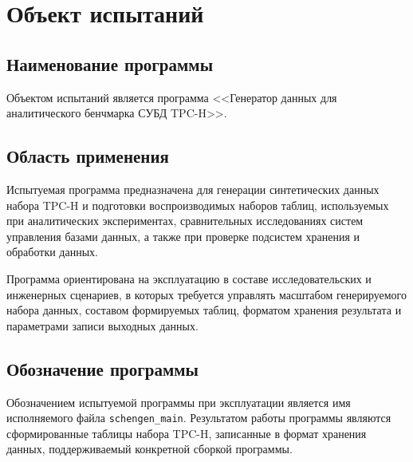 \section{Объект испытаний}

\subsection{Наименование программы}

Объектом испытаний является программа <<Генератор данных для аналитического
бенчмарка СУБД TPC-H>>.

\subsection{Область применения}

Испытуемая программа предназначена для генерации синтетических данных набора
TPC-H и подготовки воспроизводимых наборов таблиц, используемых при
аналитических экспериментах, сравнительных исследованиях систем управления
базами данных, а также при проверке подсистем хранения и обработки данных.

Программа ориентирована на эксплуатацию в составе исследовательских и
инженерных сценариев, в которых требуется управлять масштабом генерируемого
набора данных, составом формируемых таблиц, форматом хранения результата и
параметрами записи выходных данных.

\subsection{Обозначение программы}

Обозначением испытуемой программы при эксплуатации является имя исполняемого
файла \texttt{schengen\_main}. Результатом работы программы являются
сформированные таблицы набора TPC-H, записанные в формат хранения данных,
поддерживаемый конкретной сборкой программы.
